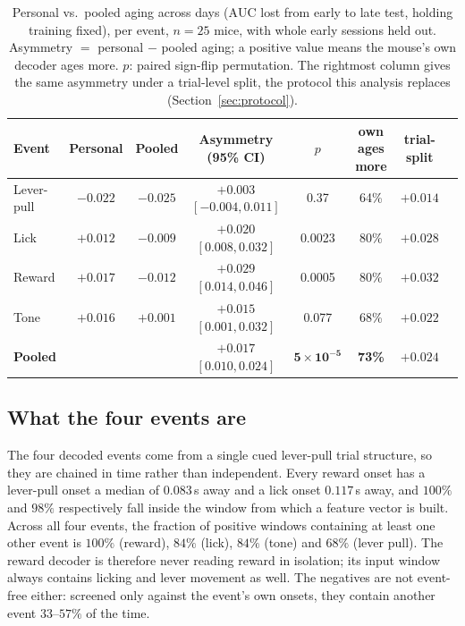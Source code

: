 \documentclass{article}
\newcommand{\auc}{\mathrm{AUC}}
\begin{document}
\begin{table}[t]\centering
\caption{Personal vs.\ pooled aging across days ($\auc$ lost from early to late test, holding
training fixed), per event, $n = 25$ mice, with whole early sessions held out. Asymmetry $=$
personal $-$ pooled aging; a positive value means the mouse's own decoder ages more. $p$: paired
sign-flip permutation. The rightmost column gives the same asymmetry under a trial-level split, the
protocol this analysis replaces (Section~\ref{sec:protocol}).}
\label{tab:asym}
\setlength{\tabcolsep}{4pt}
\begin{tabular}{lccccccc}
\toprule
Event & Personal & Pooled & Asymmetry (95\% CI) & $p$ & own ages more & trial-split \\
\midrule
Lever-pull & $-0.022$ & $-0.025$ & $+0.003$ $[-0.004, 0.011]$ & 0.37 & 64\% & $+0.014$ \\
Lick       & $+0.012$ & $-0.009$ & $+0.020$ $[0.008, 0.032]$ & 0.0023 & 80\% & $+0.028$ \\
Reward     & $+0.017$ & $-0.012$ & $+0.029$ $[0.014, 0.046]$ & 0.0005 & 80\% & $+0.032$ \\
Tone       & $+0.016$ & $+0.001$ & $+0.015$ $[0.001, 0.032]$ & 0.077 & 68\% & $+0.022$ \\
\midrule
\textbf{Pooled} & & & $\mathbf{+0.017}$ $[0.010, 0.024]$ & $\mathbf{5\times10^{-5}}$ & \textbf{73\%} & $+0.024$ \\
\bottomrule
\end{tabular}
\end{table}

\subsection{What the four events are}
\label{sec:events}
The four decoded events come from a single cued lever-pull trial structure, so they are chained in
time rather than independent. Every reward onset has a lever-pull onset a median of $0.083$\,s away
and a lick onset $0.117$\,s away, and $100\%$ and $98\%$ respectively fall inside the window from
which a feature vector is built. Across all four events, the fraction of positive windows containing
at least one other event is $100\%$ (reward), $84\%$ (lick), $84\%$ (tone) and $68\%$ (lever pull).
The reward decoder is therefore never reading reward in isolation; its input window always contains
licking and lever movement as well. The negatives are not event-free either: screened only against
the event's own onsets, they contain another event $33$--$57\%$ of the time.
\end{document}
